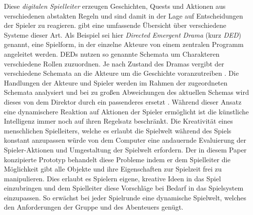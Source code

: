 Diese \emph{digitalen Spielleiter} erzeugen Geschichten, Quests und Aktionen aus verschiedenen abstakten Regeln und sind damit in der Lage auf Entscheidungen der Spieler zu reagieren. \cite{Arinbjarnarb} gibt eine umfassende Übersicht über verschiedene Systeme dieser Art. Als Beispiel sei hier \emph{Directed Emergent Drama} (kurz \emph{DED}) \cite{Arinbjarnara} genannt, eine Spielform, in der einzelne Akteure von einem zentralen Programm angeleitet werden. DEDs nutzen so genannte Schemata um Charakteren verschiedene Rollen zuzuordnen. Je nach Zustand des Dramas vergibt der  verschiedene Schemata an die Akteure um die Geschichte voranzutreiben \cite{Arinbjarnarb}. Die Handlungen der Akteure und Spieler werden im Rahmen der zugeordneten Schemata analysiert und bei zu großen Abweichungen des aktuellen Schemas wird dieses von dem Direktor durch ein passenderes ersetzt \cite{Arinbjarnar}.\newline
Während dieser Ansatz eine dynamischere Reaktion auf Aktionen der Spieler ermöglicht ist die künstliche Intelligenz immer noch auf ihren Regelsatz beschränkt. Die Kreativität eines menschlichen Spielleiters, welche es erlaubt die Spielwelt während des Spiels konstant anzupassen würde von dem Computer eine andauernde Evaluierung der Spieler-Aktionen und Umgestaltung der Spielwelt erfordern.\newline
Der in diesem Paper konzipierte Prototyp behandelt diese Probleme indem er dem Spielleiter die Möglichkeit gibt alle Objekte und ihre Eigenschaften zur Spielzeit frei zu manipulieren. Dies erlaubt es Spielern eigene, kreative Ideen in das Spiel einzubringen und dem Spielleiter diese Vorschläge bei Bedarf in das Spielsystem einzupassen. So erwächst bei jeder Spielrunde eine dynamische Spielwelt, welches den Anforderungen der Gruppe und des Abenteuers genügt.
